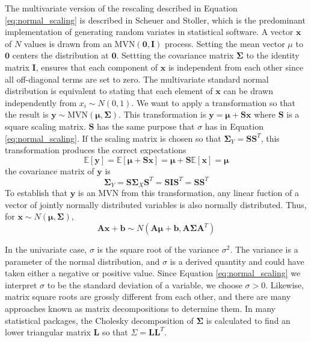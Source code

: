 The multivariate version of the rescaling described in Equation \ref{eq:normal_scaling} is described in Scheuer and Stoller\cite{scheuer1962_mvn_rv}, which is the predominant implementation of generating random variates in statistical software.  A vector $\bm{x}$ of $N$ values is drawn from an $\mathrm{MVN}(\bm{0},\bm{I})$ process.  Setting the mean vector $\mu$ to $\bm{0}$ centers the distribution at $\bm{0}$.
Settting the covariance matrix $\bm{\Sigma}$ to the identity matrix $\bm{I}$, ensures that each component of $\bm{x}$ is independent from each other since all off-diagonal terms are set to zero.  The multivariate standard normal distribution is equivalent to stating that each element of $\bm{x}$ can be drawn independently from $x_i \sim N(0,1)$.
We want to apply a transformation so that the result is $\bm{y} \sim \mathrm{MVN}(\bm{\mu},\bm{\Sigma})$.  This transformation is $\bm{y}=\bm{\mu} + \bm{S} \bm{x}$ where $\bm{S}$ is a square scaling matrix.  $\bm{S}$ has the same purpose that $\sigma$ has in Equation \ref{eq:normal_scaling}.
If the scaling matrix is chosen so that $\bm{\Sigma}_Y = \bm{S}\bm{S}^T$, this transformation produces the correct expectations
\begin{equation}
	  \mathbb{E}[\bm{y}]
		= \mathbb{E}\left[\bm{\mu} + \bm{S}\bm{x}\right]
		= \bm{\mu} + \bm{S} \mathbb{E}[\bm{x}]
		= \bm{\mu}
\end{equation}
the covariance matrix of $\bm{y}$ is
\begin{equation}
	\bm{\Sigma}_Y
	= \bm{S} \bm{\Sigma}_X \bm{S}^T
	= \bm{S} \bm{I} \bm{S}^T
	= \bm{S}\bm{S}^T
\end{equation}
To establish that $\bm{y}$ is an MVN from this transformation, any linear fuction of a vector of jointly normally distributed variables is also normally distributed\cite{greene2003}.  Thus, for $\bm{x} \sim N(\bm{\mu},\bm{\Sigma})$,
\begin{equation}
    \bm{A} \bm{x} + \bm{b}
		\sim N(\bm{A} \bm{\mu} + \bm{b},
		       \bm{A} \bm{\Sigma} \bm{A}^T)
\end{equation}

In the univariate case, $\sigma$ is the square root of the variance $\sigma^2$.  The variance is a parameter of the normal distribution, and $\sigma$ is a derived quantity and could have taken either a negative or positive value.  Since Equation \ref{eq:normal_scaling} we interpret $\sigma$ to be the standard deviation of a variable, we choose $\sigma > 0$.  Likewise, matrix square roots are grossly different from each other, and there are many approaches known as matrix decompositions to determine them.  In many statistical packages, the Cholesky decomposition of $\bm{\Sigma}$ is calculated to find an lower triangular matrix $\bm{L}$ so that $\Sigma = \bm{L}\bm{L}^T$\cite{golub1996_matrices}.

